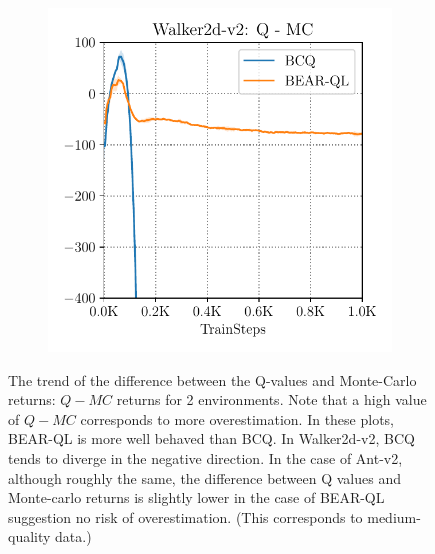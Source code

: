 \begin{figure}[h]
\begin{subfigure}[h]{0.31\textwidth}
        \includegraphics[width=0.99\linewidth]{chapters/bear/images/walker_q_vs_mc.pdf}
    \end{subfigure}%
    \caption{The trend of the difference between the Q-values and Monte-Carlo returns: $Q - MC$ returns for 2 environments. Note that a high value of $Q-MC$ corresponds to more overestimation. In these plots, BEAR-QL is more well behaved than BCQ. In Walker2d-v2, BCQ tends to diverge in the negative direction. In the case of Ant-v2, although roughly the same, the difference between Q values and Monte-carlo returns is slightly lower in the case of BEAR-QL suggestion no risk of overestimation. (This corresponds to medium-quality data.)}
    \label{fig:q_mc}
\end{figure}

